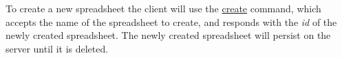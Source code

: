 To create a new spreadsheet the client will use the \hyperref[lst:command:create]{create} command, 
which accepts the name of the spreadsheet to create, and responds with the 
\emph{id} of the newly created spreadsheet. The newly created spreadsheet 
will persist on the server until it is deleted.
